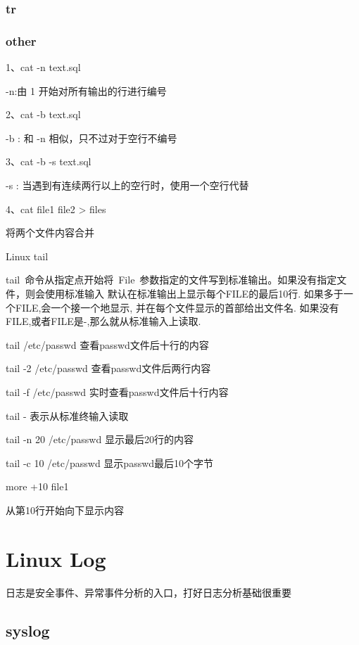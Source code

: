 \documentclass[letterpaper,10pt]{sphinxmanual}
\begin{document}
\subsubsection{tr}
\label{Linux_find/content:tr}

\subsubsection{other}
\label{Linux_find/content:other}
1、cat -n text.sql

-n:由 1 开始对所有输出的行进行编号

2、cat -b text.sql

-b : 和 -n 相似，只不过对于空行不编号

3、cat -b -s text.sql

-s : 当遇到有连续两行以上的空行时，使用一个空行代替

4、cat file1 file2 \textgreater{} files

将两个文件内容合并

Linux tail

tail 命令从指定点开始将 File 参数指定的文件写到标准输出。如果没有指定文件，则会使用标准输入
默认在标准输出上显示每个FILE的最后10行. 如果多于一个FILE,会一个接一个地显示, 并在每个文件显示的首部给出文件名. 如果没有FILE,或者FILE是-,那么就从标准输入上读取.

tail /etc/passwd 查看passwd文件后十行的内容

tail -2 /etc/passwd  查看passwd文件后两行内容

tail -f /etc/passwd  实时查看passwd文件后十行内容

tail - 表示从标准终输入读取

tail -n 20 /etc/passwd 显示最后20行的内容

tail -c 10 /etc/passwd 显示passwd最后10个字节

more +10 file1

从第10行开始向下显示内容


\section{Linux Log}
\label{Linux_log/index::doc}\label{Linux_log/index:linux-log}
日志是安全事件、异常事件分析的入口，打好日志分析基础很重要


\subsection{syslog}
\label{Linux_log/syslog:syslog}\label{Linux_log/syslog::doc}
\end{document}
